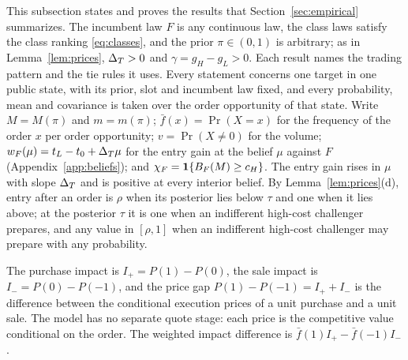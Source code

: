 This subsection states and proves the results that Section~\ref{sec:empirical} summarizes. The incumbent law \(F\)
is any continuous law, the class laws satisfy the class ranking \eqref{eq:classes}, and the prior \(\pi\in(0,1)\) is
arbitrary; as in Lemma~\ref{lem:prices}, \(\Delta_T>0\) and \(\gamma=g_H-g_L>0\). Each result names the trading pattern
and the tie rules it uses. Every statement concerns one target in one public state, with its prior, slot and
incumbent law fixed, and every probability, mean and covariance is taken over the order opportunity of that state.
Write \(M=M(\pi)\) and \(m=m(\pi)\); \(\bar f(x)=\Pr(X=x)\) for the frequency of the order \(x\) per order
opportunity; \(v=\Pr(X\ne0)\) for the volume; \(w_F(\mu)=t_L-t_0+\Delta_T\mu\) for the entry gain at the belief \(\mu\)
against \(F\) (Appendix~\ref{app:beliefs}); and \(\chi_F=\mathbf{1}\{B_F(M)\ge c_H\}\). The entry gain rises in \(\mu\) with
slope \(\Delta_T\) and is positive at every interior belief. By Lemma~\ref{lem:prices}(d), entry after an order is \(\rho\)
when its posterior lies below \(\tau\) and one when it lies above; at the posterior \(\tau\) it is one when an
indifferent high-cost challenger prepares, and any value in \([\rho,1]\) when an indifferent high-cost challenger
may prepare with any probability.

The purchase impact is \(I_+=P(1)-P(0)\), the sale impact is \(I_-=P(0)-P(-1)\), and the price gap
\(P(1)-P(-1)=I_++I_-\) is the difference between the conditional execution prices of a unit purchase and a unit
sale. The model has no separate quote stage: each price is the competitive value conditional on the order. The
weighted impact difference is \(\bar f(1)I_+-\bar f(-1)I_-\).

